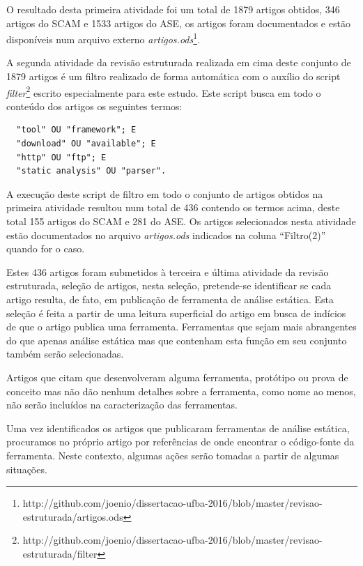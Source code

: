 O resultado desta primeira atividade foi um total de 1879 artigos obtidos, 346
artigos do SCAM e 1533 artigos do ASE, os artigos foram documentados e estão disponíveis num arquivo externo
{\it artigos.ods}\footnote{http://github.com/joenio/dissertacao-ufba-2016/blob/master/revisao-estruturada/artigos.ods}.

A segunda atividade da revisão estruturada realizada em cima deste conjunto de
1879 artigos é um filtro realizado de forma automática com o auxílio do script
{\it
filter}\footnote{http://github.com/joenio/dissertacao-ufba-2016/blob/master/revisao-estruturada/filter}
escrito especialmente para este estudo. Este script busca em todo o conteúdo
dos artigos os seguintes termos:

\begin{verbatim}
  "tool" OU "framework"; E
  "download" OU "available"; E
  "http" OU "ftp"; E
  "static analysis" OU "parser".
\end{verbatim}

A execução deste script de filtro em todo o conjunto de artigos obtidos na
primeira atividade resultou num total de 436 contendo os termos acima, deste
total 155 artigos do SCAM e 281 do ASE. Os artigos selecionados nesta atividade
estão documentados no arquivo {\it artigos.ods} indicados na coluna ``Filtro(2)''
quando for o caso.

Estes 436 artigos foram submetidos à terceira e última atividade da revisão estruturada,
seleção de artigos, nesta seleção, pretende-se identificar se cada artigo
resulta, de fato, em publicação de ferramenta de análise estática. Esta seleção
é feita a partir de uma leitura superficial do artigo em busca de indícios de
que o artigo publica uma ferramenta. Ferramentas que sejam mais abrangentes do
que apenas análise estática mas que contenham esta função em seu conjunto
também serão selecionadas.

Artigos que citam que desenvolveram alguma ferramenta, protótipo ou prova de
conceito mas não dão nenhum detalhes sobre a ferramenta, como nome ao menos,
não serão incluídos na caracterização das ferramentas.

Uma vez identificados os artigos que publicaram ferramentas de análise
estática, procuramos no próprio artigo por referências de onde encontrar o
código-fonte da ferramenta. Neste contexto, algumas ações serão tomadas a
partir de algumas situações.

